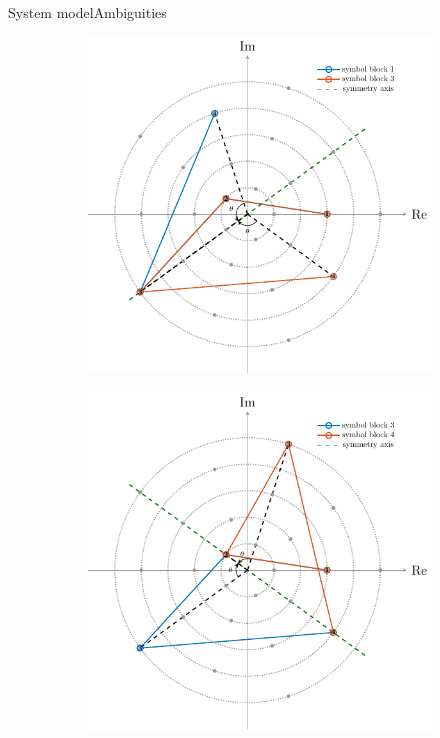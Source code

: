 \documentclass[en]{sdqbeamer}
\begin{document}
\begin{frame}{System model}{Ambiguities}
\begin{figure}[htb]
     \centering
     \begin{subfigure}[b]{0.4\textwidth}
         \centering
         \includegraphics[width=\textwidth]{Eq_class_construction_2.pdf}
     \end{subfigure}
     \hspace{10mm}
     \begin{subfigure}[b]{0.4\textwidth}
         \centering
         \includegraphics[width=\textwidth]{Eq_class_construction_3.pdf}
     \end{subfigure}
\end{figure}

\end{frame}
\end{document}
